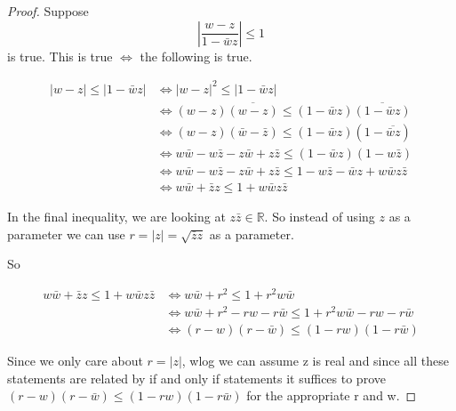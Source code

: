 \documentclass{article}
\newcommand{\R}{\mathbb{R}}
\newcommand{\abs}[1]{\left\lvert #1\right\rvert}
\begin{document}
\begin{proof}
    Suppose 
    \[\abs{\frac{w - z}{1 - \bar{w}z}} \leq 1\]
    is true. This is true $\iff$ the following is true.
    
    \begin{align*}
        |w - z| \leq |1 - \bar{w}z| &\iff |w-z|^2 \leq |1 - \bar{w}z| \\
        &\iff (w-z)\overline{(w - z)} \leq (1 - \bar{w}z)\overline{(1 - \bar{w}z)} \\ 
        &\iff (w-z)(\bar{w} - \bar{z}) \leq (1 - \bar{w}z)(1 - \overline{\bar{w}z}) \\
        &\iff w\bar{w} - w\bar{z} - z\bar{w} + z\bar{z} \leq (1 - \bar{w} z)(1 - w\bar{z}) \\
        &\iff w\bar{w} - w\bar{z} - z\bar{w} + z\bar{z} \leq 1 - w \bar {z} - \bar{w} z + w\bar{w}z\bar{z} \\
        &\iff w\bar{w} + \bar{z} z \leq 1 + w\bar{w}z\bar{z}
    \end{align*}

    In the final inequality, we are looking at $z \bar{z} \in \R$. So instead of using $z$ as a parameter we can use $r = |z| = \sqrt{\bar{z}z}$ as a parameter. 

    So 

    \begin{align*}
        w\bar{w} + \bar{z} z \leq 1 + w\bar{w}z\bar{z} &\iff w\bar{w} + r^2 \leq 1 + r^2w\bar{w} \\
        &\iff w\bar{w} + r^2 - rw - r\bar{w} \leq 1 + r^2w\bar{w}- rw - r\bar{w} \\
        &\iff (r - w)(r - \bar{w}) \leq (1 - rw)(1 - r\bar{w})
    \end{align*}

    Since we only care about $r = |z|$, wlog we can assume z is real and since all these statements are related by if and only if statements it suffices to prove $(r - w)(r - \bar{w}) \leq (1 - rw)(1 - r\bar{w})$ for the appropriate r and w.
\end{proof}
\end{document}
